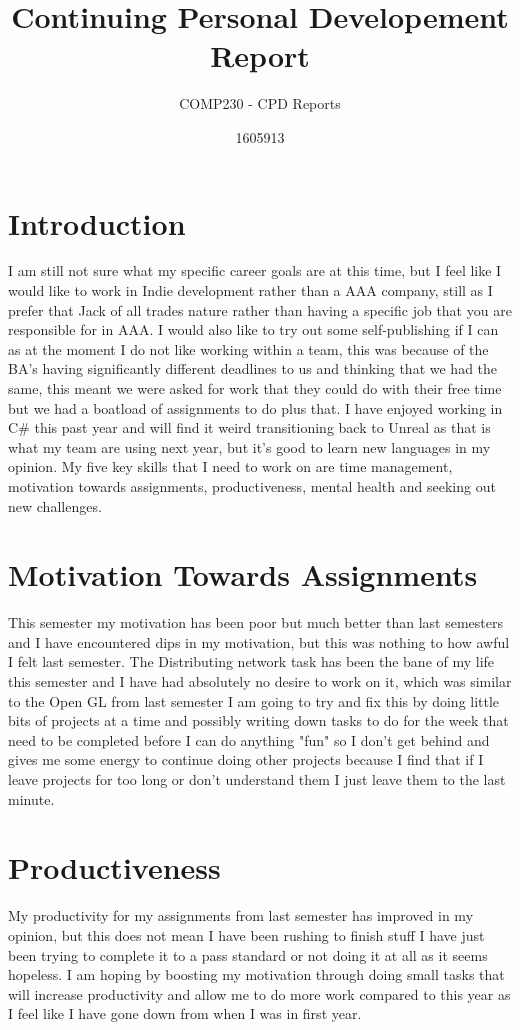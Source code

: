 \documentclass[11pt]{scrartcl}
\title{Continuing Personal Developement Report}
\subtitle{COMP230 - CPD Reports}
\author{1605913}
\begin{document}
\maketitle


\section*{Introduction}

I am still not sure what my specific career goals are at this time, but I feel like I would like to work in Indie development rather than a AAA company, still as I prefer that Jack of all trades nature rather than having a specific job that you are responsible for in AAA. I would also like to try out some self-publishing if I can as at the moment I do not like working within a team, this was because of the BA's having significantly different deadlines to us and thinking that we had the same, this meant we were asked for work that they could do with their free time but we had a boatload of assignments to do plus that. I have enjoyed working in C\# this past year and will find it weird transitioning back to Unreal as that is what my team are using next year, but it's good to learn new languages in my opinion. My five key skills that I need to work on are time management, motivation towards assignments, productiveness, mental health and seeking out new challenges.

\section{Motivation Towards Assignments}
This semester my motivation has been poor but much better than last semesters and I have encountered dips in my motivation, but this was nothing to how awful I felt last semester. The Distributing network task has been the bane of my life this semester and I have had absolutely no desire to work on it, which was similar to the Open GL from last semester I am going to try and fix this by doing little bits of projects at a time and possibly writing down tasks to do for the week that need to be completed before I can do anything "fun" so I don't get behind and gives me some energy to continue doing other projects because I find that if I leave projects for too long or don't understand them I just leave them to the last minute.

\section{Productiveness}
My productivity for my assignments from last semester has improved in my opinion, but this does not mean I have been rushing to finish stuff I have just been trying to complete it to a pass standard or not doing it at all as it seems hopeless. I am hoping by boosting my motivation through doing small tasks that will increase productivity and allow me to do more work compared to this year as I feel like I have gone down from when I was in first year.
\end{document}

